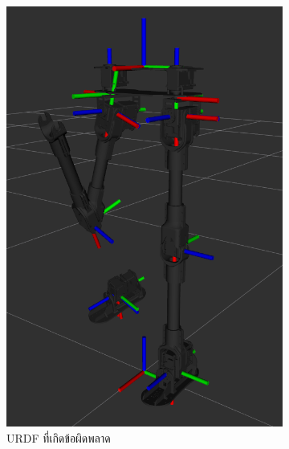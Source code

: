 \begin{figure}[!ht]
    \centering
    \begin{subfigure}[b]{0.3\textwidth}
        \centering
        \includegraphics[width=\textwidth]{chapter4/images/urdf_rviz1.png}
        \caption{URDF ที่เกิดข้อผิดพลาด}
    \end{subfigure}
    \hfill
    \begin{subfigure}[b]{0.5\textwidth}
        \centering

\end{subfigure}
\end{figure}
